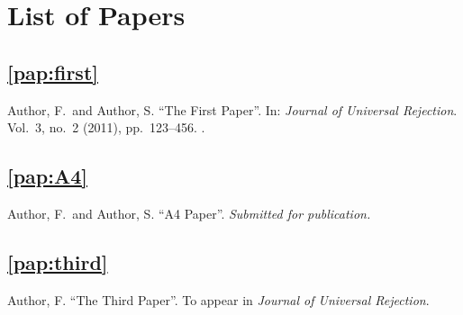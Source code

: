 \chapter{List of Papers}


\section*{\cref{pap:first}}
Author, F.\ and Author, S.
\enquote{The First Paper}.
In: \emph{Journal of Universal Rejection}.
Vol.\ 3,
no.\ 2
(2011),
pp.~123--456.
.

\section*{\cref{pap:A4}}
Author, F.\ and Author, S.
\enquote{A4 Paper}.
\emph{Submitted for publication.}

\section*{\cref{pap:third}}
Author, F.
\enquote{The Third Paper}.
To appear in \emph{Journal of Universal Rejection}.